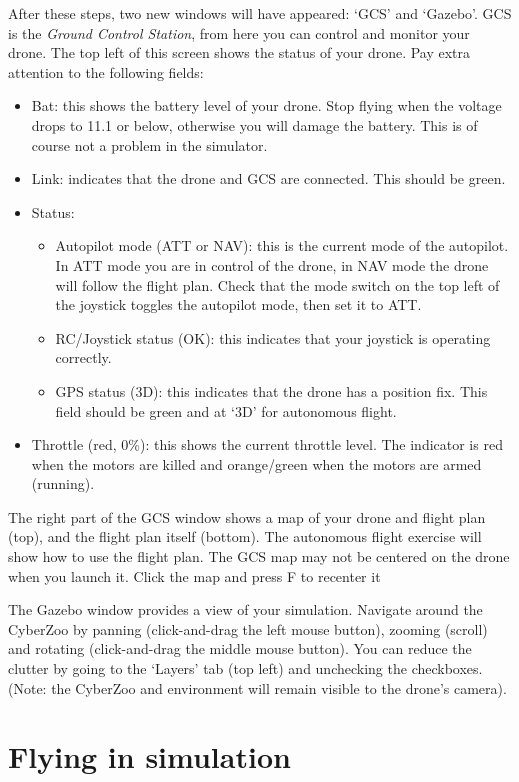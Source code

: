 After these steps, two new windows will have appeared: `GCS' and `Gazebo'.
GCS is the \emph{Ground Control Station}, from here you can control and monitor your drone.
The top left of this screen shows the status of your drone. Pay extra attention to the following fields:

\begin{itemize}
	\item Bat: this shows the battery level of your drone. Stop flying when the voltage drops to 11.1 or below, otherwise you will damage the battery. This is of course not a problem in the simulator.
	\item Link: indicates that the drone and GCS are connected. This should be green.
	\item Status:
	\begin{itemize}
		\item Autopilot mode (ATT or NAV): this is the current mode of the autopilot. In ATT mode you are in control of the drone, in NAV mode the drone will follow the flight plan. Check that the mode switch on the top left of the joystick toggles the autopilot mode, then set it to ATT.
		\item RC/Joystick status (OK): this indicates that your joystick is operating correctly.
		\item GPS status (3D): this indicates that the drone has a position fix. This field should be green and at `3D' for autonomous flight.
	\end{itemize}
	\item Throttle (red, 0\%): this shows the current throttle level. The indicator is red when the motors are killed and orange/green when the motors are armed (running).
\end{itemize}

The right part of the GCS window shows a map of your drone and flight plan (top), and the flight plan itself (bottom). The autonomous flight exercise will show how to use the flight plan. The GCS map may not be centered on the drone when you launch it. Click the map and press F to recenter it

The Gazebo window provides a view of your simulation. Navigate around the CyberZoo by panning (click-and-drag the left mouse button), zooming (scroll) and rotating (click-and-drag the middle mouse button).
You can reduce the clutter by going to the `Layers' tab (top left) and unchecking the checkboxes. (Note: the CyberZoo and environment will remain visible to the drone's camera).

\section{Flying in simulation}

